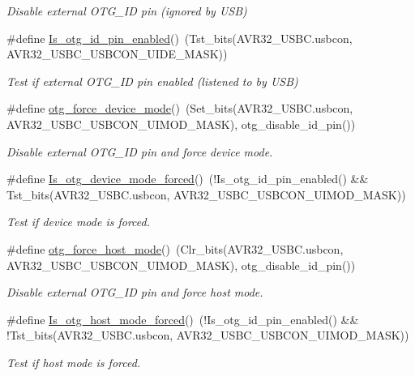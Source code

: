 \begin{DoxyCompactItemize}
\begin{DoxyCompactList}\small\item\em \-Disable external \-O\-T\-G\-\_\-\-I\-D pin (ignored by \-U\-S\-B) \end{DoxyCompactList}\item 
\#define \hyperlink{group__otg__group_ga0c4344aeac9372eb1c455f23a844e1c8}{\-Is\-\_\-otg\-\_\-id\-\_\-pin\-\_\-enabled}()~(\-Tst\-\_\-bits(\-A\-V\-R32\-\_\-\-U\-S\-B\-C.\-usbcon, \-A\-V\-R32\-\_\-\-U\-S\-B\-C\-\_\-\-U\-S\-B\-C\-O\-N\-\_\-\-U\-I\-D\-E\-\_\-\-M\-A\-S\-K))
\begin{DoxyCompactList}\small\item\em \-Test if external \-O\-T\-G\-\_\-\-I\-D pin enabled (listened to by \-U\-S\-B) \end{DoxyCompactList}\item 
\#define \hyperlink{group__otg__group_ga0a20b90b831ebf250983ef5e15f6d561}{otg\-\_\-force\-\_\-device\-\_\-mode}()~(\-Set\-\_\-bits(\-A\-V\-R32\-\_\-\-U\-S\-B\-C.\-usbcon, \-A\-V\-R32\-\_\-\-U\-S\-B\-C\-\_\-\-U\-S\-B\-C\-O\-N\-\_\-\-U\-I\-M\-O\-D\-\_\-\-M\-A\-S\-K), otg\-\_\-disable\-\_\-id\-\_\-pin())
\begin{DoxyCompactList}\small\item\em \-Disable external \-O\-T\-G\-\_\-\-I\-D pin and force device mode. \end{DoxyCompactList}\item 
\#define \hyperlink{group__otg__group_gab9ff6cbcfe6c371a2cb9493c182fa6a8}{\-Is\-\_\-otg\-\_\-device\-\_\-mode\-\_\-forced}()~(!\-Is\-\_\-otg\-\_\-id\-\_\-pin\-\_\-enabled() \&\& \-Tst\-\_\-bits(\-A\-V\-R32\-\_\-\-U\-S\-B\-C.\-usbcon, \-A\-V\-R32\-\_\-\-U\-S\-B\-C\-\_\-\-U\-S\-B\-C\-O\-N\-\_\-\-U\-I\-M\-O\-D\-\_\-\-M\-A\-S\-K))
\begin{DoxyCompactList}\small\item\em \-Test if device mode is forced. \end{DoxyCompactList}\item 
\#define \hyperlink{group__otg__group_ga7a96147ad9ff7531f799c5e2127efad1}{otg\-\_\-force\-\_\-host\-\_\-mode}()~(\-Clr\-\_\-bits(\-A\-V\-R32\-\_\-\-U\-S\-B\-C.\-usbcon, \-A\-V\-R32\-\_\-\-U\-S\-B\-C\-\_\-\-U\-S\-B\-C\-O\-N\-\_\-\-U\-I\-M\-O\-D\-\_\-\-M\-A\-S\-K), otg\-\_\-disable\-\_\-id\-\_\-pin())
\begin{DoxyCompactList}\small\item\em \-Disable external \-O\-T\-G\-\_\-\-I\-D pin and force host mode. \end{DoxyCompactList}\item 
\#define \hyperlink{group__otg__group_ga8d245cf2f27f09d9ae4dd6e68ef451eb}{\-Is\-\_\-otg\-\_\-host\-\_\-mode\-\_\-forced}()~(!\-Is\-\_\-otg\-\_\-id\-\_\-pin\-\_\-enabled() \&\& !\-Tst\-\_\-bits(\-A\-V\-R32\-\_\-\-U\-S\-B\-C.\-usbcon, \-A\-V\-R32\-\_\-\-U\-S\-B\-C\-\_\-\-U\-S\-B\-C\-O\-N\-\_\-\-U\-I\-M\-O\-D\-\_\-\-M\-A\-S\-K))
\begin{DoxyCompactList}\small\item\em \-Test if host mode is forced. \end{DoxyCompactList}\end{DoxyCompactItemize}
